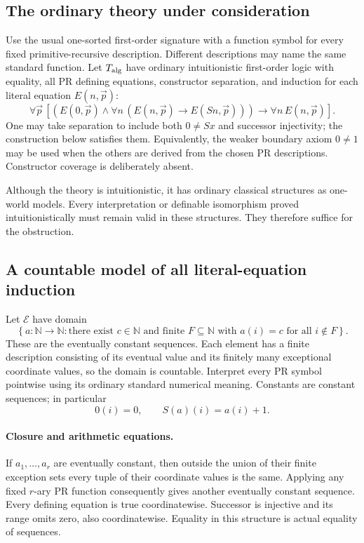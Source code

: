 \documentclass[11pt,letterpaper]{article}
\theoremstyle{definition}\newtheorem{definition}[theorem]{Definition}
\theoremstyle{remark}\newtheorem{remark}[theorem]{Remark}
\begin{document}
\subsection{The ordinary theory under consideration}

Use the usual one-sorted first-order signature with a function symbol
for every fixed primitive-recursive description.  Different descriptions
may name the same standard function.  Let $T_{\rm alg}$ have ordinary
intuitionistic first-order logic with equality, all PR defining equations,
constructor separation, and induction for each literal equation
$E(n,\vec p)$:
\[
 \forall\vec p\,
 \left[
 \left(E(0,\vec p)\land
       \forall n\,(E(n,\vec p)\to E(Sn,\vec p))\right)
 \to\forall n\,E(n,\vec p)
 \right].
 \tag{EI}
\]
One may take separation to include both $0\ne Sx$ and successor
injectivity; the construction below satisfies them.  Equivalently,
the weaker boundary axiom $0\ne1$ may be used when the others are
derived from the chosen PR descriptions.  Constructor coverage is
deliberately absent.

Although the theory is intuitionistic, it has ordinary classical
structures as one-world models.  Every interpretation or definable
isomorphism proved intuitionistically must remain valid in these
structures.  They therefore suffice for the obstruction.

\subsection{A countable model of all literal-equation induction}

Let $\mathcal E$ have domain
\[
 \left\{a:\mathbb N\to\mathbb N:
   \text{there exist }c\in\mathbb N\text{ and finite }F\subseteq\mathbb N
   \text{ with }a(i)=c\text{ for all }i\notin F\right\}.
 \tag{Domain}
\]
These are the eventually constant sequences.  Each element has a
finite description consisting of its eventual value and its finitely
many exceptional coordinate values, so the domain is countable.
Interpret every PR symbol pointwise using its ordinary standard
numerical meaning.  Constants are constant sequences; in particular
\[
 0(i)=0,\qquad S(a)(i)=a(i)+1.
\]

\paragraph{Closure and arithmetic equations.}
If $a_1,\ldots,a_r$ are eventually constant, then outside the union
of their finite exception sets every tuple of their coordinate values
is the same.  Applying any fixed $r$-ary PR function consequently gives
another eventually constant sequence.  Every defining equation is true
coordinatewise.  Successor is injective and its range omits zero,
also coordinatewise.  Equality in this structure is actual equality of
sequences.
\end{document}

